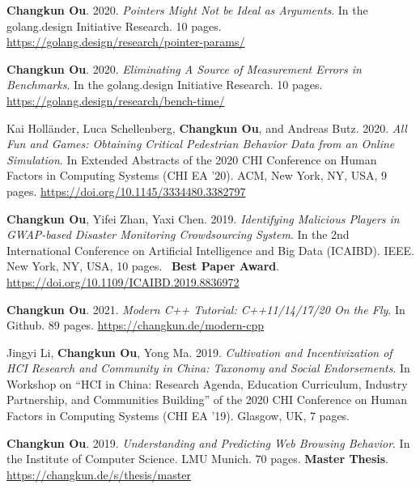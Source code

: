     \item{
        \textbf{Changkun Ou}. 2020.
        \emph{Pointers Might Not be Ideal as Arguments}.
        In the golang.design Initiative Research. 10 pages.
        \url{https://golang.design/research/pointer-params/}
    }
    \item{
        \textbf{Changkun Ou}. 2020.
        \emph{Eliminating A Source of Measurement Errors in Benchmarks}.
        In the golang.design Initiative Research. 10 pages.
        \url{https://golang.design/research/bench-time/}
    }
    \item{
        Kai Holländer, Luca Schellenberg, \textbf{Changkun Ou}, and Andreas Butz. 2020.
        \emph{All Fun and Games: Obtaining Critical Pedestrian Behavior Data from an Online Simulation}.
        In Extended Abstracts of the 2020 CHI Conference on Human Factors in Computing Systems (CHI EA '20). ACM, New York, NY, USA, 9 pages.
        \url{https://doi.org/10.1145/3334480.3382797}
    }
    \item{
        \textbf{Changkun Ou}, Yifei Zhan, Yaxi Chen. 2019.
        \emph{Identifying Malicious Players in GWAP-based Disaster Monitoring Crowdsourcing System}.
        In the 2nd International Conference on Artificial Intelligence and Big Data (ICAIBD). IEEE. New York, NY, USA, 10 pages. \faAward~\textbf{Best Paper Award}.
        \url{https://doi.org/10.1109/ICAIBD.2019.8836972}
    }
    \item{
        \textbf{Changkun Ou}. 2021.
        \emph{Modern C++ Tutorial: C++11/14/17/20 On the Fly}.
        In Github. 89 pages.
        \url{https://changkun.de/modern-cpp}
    }
    \item{
        Jingyi Li, \textbf{Changkun Ou}, Yong Ma. 2019.
        \emph{Cultivation and Incentivization of HCI Research and Community in China: Taxonomy and Social Endorsements}.
        In Workshop on ``HCI in China: Research Agenda, Education Curriculum, Industry Partnership, and Communities Building'' of the 2020 CHI Conference on Human Factors in Computing Systems (CHI EA '19). Glasgow, UK, 7 pages.
    }
    \item{
        \textbf{Changkun Ou}. 2019.
        \emph{Understanding and Predicting Web Browsing Behavior}.
        In the Institute of Computer Science. LMU Munich. 70 pages. \textbf{Master Thesis}.
        \url{https://changkun.de/s/thesis/master}
    }
